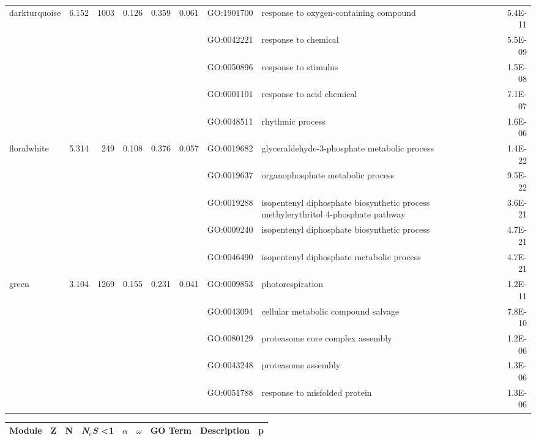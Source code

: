 \begin{landscape}
\begin{table}[ht]
\begin{tabular}{|l|rrrrrlP{5cm}r|}
  darkturquoise & 6.152 & 1003 & 0.126 & 0.359 & 0.061 & GO:1901700 & response to oxygen-containing compound & 5.4E-11 \\ 
   &  &  &  &  &  & GO:0042221 & response to chemical & 5.5E-09 \\ 
   &  &  &  &  &  & GO:0050896 & response to stimulus & 1.5E-08 \\ 
   &  &  &  &  &  & GO:0001101 & response to acid chemical & 7.1E-07 \\ 
   &  &  &  &  &  & GO:0048511 & rhythmic process & 1.6E-06 \\ 
\hline  
floralwhite & 5.314 & 249 & 0.108 & 0.376 & 0.057 & GO:0019682 & glyceraldehyde-3-phosphate metabolic process & 1.4E-22 \\ 
   &  &  &  &  &  & GO:0019637 & organophosphate metabolic process & 9.5E-22 \\ 
   &  &  &  &  &  & GO:0019288 & isopentenyl diphosphate biosynthetic process  methylerythritol 4-phosphate pathway
 & 3.6E-21 \\ 
   &  &  &  &  &  & GO:0009240 & isopentenyl diphosphate biosynthetic process & 4.7E-21 \\ 
   &  &  &  &  &  & GO:0046490 & isopentenyl diphosphate metabolic process & 4.7E-21 \\ 
\hline 
 green & 3.104 & 1269 & 0.155 & 0.231 & 0.041 & GO:0009853 & photorespiration & 1.2E-11 \\ 
   &  &  &  &  &  & GO:0043094 & cellular metabolic compound salvage & 7.8E-10 \\ 
   &  &  &  &  &  & GO:0080129 & proteasome core complex assembly & 1.2E-06 \\ 
   &  &  &  &  &  & GO:0043248 & proteasome assembly & 1.3E-06 \\ 
   &  &  &  &  &  & GO:0051788 & response to misfolded protein & 1.3E-06 \\ 
\hline 

\end{tabular}
\end{table}


\begin{table}[ht]
\centering
\begin{tabular}{|l|rrrrrlP{5cm}r|}
  \hline
Module & Z & N & \textit{N$_{e}$S} \textless 1 & $\alpha$ & $\omega$ & GO Term & Description & p \\ 
  \hline


\end{tabular}
\end{table}
\end{landscape}
